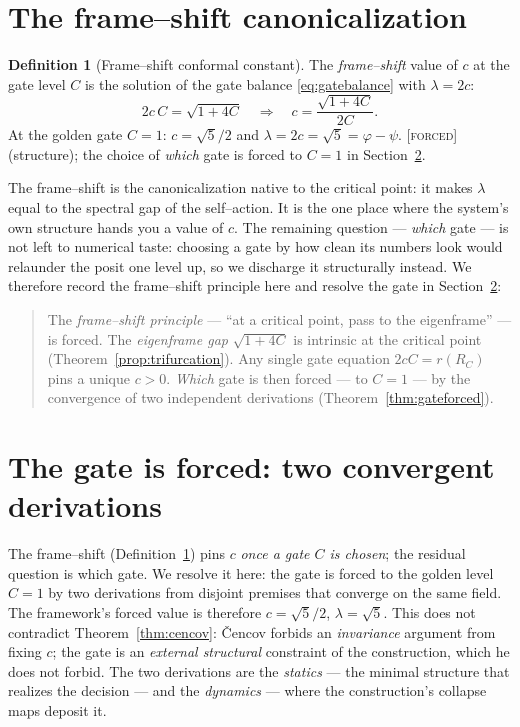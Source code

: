 \documentclass[11pt]{article}
\theoremstyle{plain}
\theoremstyle{definition}
\newtheorem{definition}[theorem]{Definition}
\theoremstyle{remark}
\newcommand{\forced}{\textcolor{forcedc}{\textsc{[forced]}}}
\begin{document}
\section{The frame--shift canonicalization}\label{sec:frameshift}

\begin{definition}[Frame--shift conformal constant]\label{def:frameshift}
The \emph{frame--shift} value of $c$ at the gate level $C$ is the solution of the gate balance \eqref{eq:gatebalance} with $\lambda=2c$:
\begin{equation}\label{eq:frameshift}
2c\,C = \sqrt{1+4C} \quad\Longrightarrow\quad c = \frac{\sqrt{1+4C}}{2C}.
\end{equation}
At the golden gate $C=1$: $c=\sqrt5/2$ and $\lambda = 2c = \sqrt5 = \varphi-\psi$. \forced{} (structure); the choice of \emph{which} gate is forced to $C=1$ in Section~\ref{sec:gateforced}.
\end{definition}

The frame--shift is the canonicalization native to the critical point: it makes $\lambda$ equal to the spectral gap of the self--action. It is the one place where the system's own structure hands you a value of $c$. The remaining question --- \emph{which} gate --- is not left to numerical taste: choosing a gate by how clean its numbers look would relaunder the posit one level up, so we discharge it structurally instead. We therefore record the frame--shift principle here and resolve the gate in Section~\ref{sec:gateforced}:
\begin{quote}
The \emph{frame--shift principle} --- ``at a critical point, pass to the eigenframe'' --- is forced. The \emph{eigenframe gap} $\sqrt{1+4C}$ is intrinsic at the critical point (Theorem~\ref{prop:trifurcation}). Any single gate equation $2cC=r(R_C)$ pins a unique $c>0$. \emph{Which} gate is then forced --- to $C=1$ --- by the convergence of two independent derivations (Theorem~\ref{thm:gateforced}).
\end{quote}

\section{The gate is forced: two convergent derivations}\label{sec:gateforced}

The frame--shift (Definition~\ref{def:frameshift}) pins $c$ \emph{once a gate $C$ is chosen}; the residual question is which gate. We resolve it here: the gate is forced to the golden level $C=1$ by two derivations from disjoint premises that converge on the same field. The framework's forced value is therefore $c=\sqrt5/2$, $\lambda=\sqrt5$. This does not contradict Theorem~\ref{thm:cencov}: \v{C}encov forbids an \emph{invariance} argument from fixing $c$; the gate is an \emph{external structural} constraint of the construction, which he does not forbid. The two derivations are the \emph{statics} --- the minimal structure that realizes the decision --- and the \emph{dynamics} --- where the construction's collapse maps deposit it.
\end{document}
